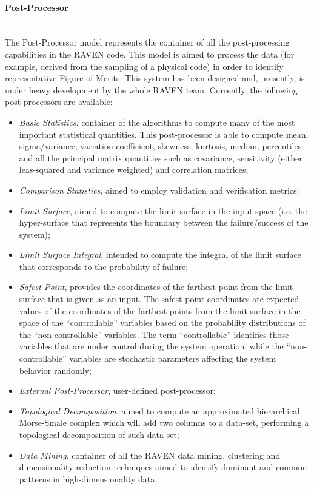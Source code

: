 \paragraph{Post-Processor} ~\\
The Post-Processor model represents the container of all the post-processing capabilities in the RAVEN code. This model is aimed to process the data (for example, derived from the sampling of a physical code) in order to identify representative Figure of Merits. This system has  been designed and, presently, is under heavy development by the whole RAVEN team.  Currently, the following post-processors are available:
\begin{itemize}
 \item \textit{Basic Statistics}, container of the algorithms to compute many of the most important statistical quantities. This post-processor is able to compute mean, sigma/variance, variation coefficient, skewness, kurtosis, median, percentiles and all the principal matrix quantities such as covariance, sensitivity (either leas-squared and variance weighted) and correlation matrices;
 \item \textit{Comparison Statistics}, aimed to employ validation and verification metrics;
 \item \textit{Limit Surface}, aimed to compute the limit surface in the input space (i.e. the hyper-surface that represents the boundary between the failure/success of the system);
 \item \textit{Limit Surface Integral}, intended to compute the integral of the limit surface that corresponds to the probability of failure;
  \item \textit{Safest Point}, provides the coordinates of the farthest point from the limit surface that is given as an input. The safest point coordinates are expected values of the coordinates of the farthest points from the limit surface in the space of the ``controllable'' variables based on the probability distributions of the ``non-controllable'' variables. The term ``controllable'' identifies those variables that are under control during the system operation, while the ``non-controllable'' variables are stochastic parameters affecting the system behavior randomly;
 \item \textit{External Post-Processor}, user-defined post-processor;
 \item \textit{Topological Decomposition}, aimed to compute an approximated hierarchical Morse-Smale complex which will add two columns to a data-set, performing a topological decomposition of such data-set;
 \item \textit{Data Mining}, container of all the RAVEN data mining, clustering and dimensionality reduction techniques aimed to identify dominant and common patterns in high-dimensionality data.
\end{itemize}

